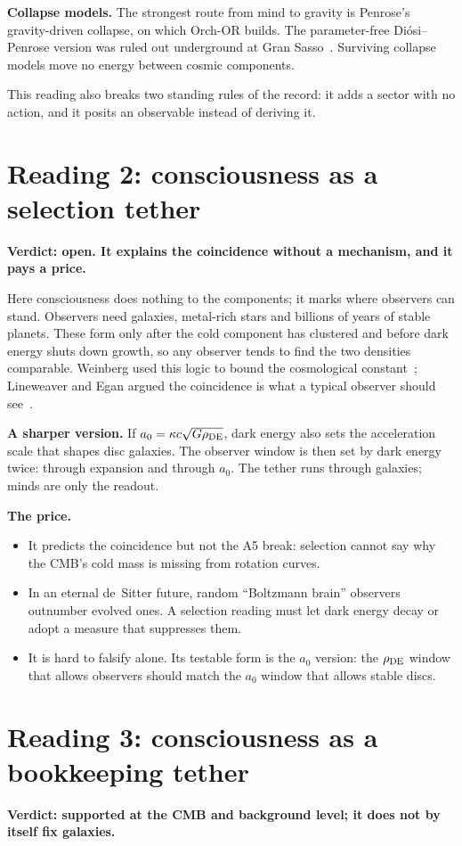 \documentclass[10pt]{article}
\begin{document}
\textbf{Collapse models.} The strongest route from mind to gravity is Penrose's gravity-driven collapse, on which Orch-OR builds. The parameter-free Di\'osi--Penrose version was ruled out underground at Gran Sasso~\cite{donadi}. Surviving collapse models move no energy between cosmic components.

This reading also breaks two standing rules of the record: it adds a sector with no action, and it posits an observable instead of deriving it.

\section{Reading 2: consciousness as a selection tether}\label{sec:selection}
\textbf{Verdict: open. It explains the coincidence without a mechanism, and it pays a price.}

Here consciousness does nothing to the components; it marks where observers can stand. Observers need galaxies, metal-rich stars and billions of years of stable planets. These form only after the cold component has clustered and before dark energy shuts down growth, so any observer tends to find the two densities comparable. Weinberg used this logic to bound the cosmological constant~\cite{weinberg}; Lineweaver and Egan argued the coincidence is what a typical observer should see~\cite{lineweaver}.

\textbf{A sharper version.} If $a_0=\kappa c\sqrt{G\rho_{\rm DE}}$, dark energy also sets the acceleration scale that shapes disc galaxies. The observer window is then set by dark energy twice: through expansion and through $a_0$. The tether runs through galaxies; minds are only the readout.

\textbf{The price.}
\begin{itemize}
\item It predicts the coincidence but not the A5 break: selection cannot say why the CMB's cold mass is missing from rotation curves.
\item In an eternal de~Sitter future, random ``Boltzmann brain'' observers outnumber evolved ones. A selection reading must let dark energy decay or adopt a measure that suppresses them.
\item It is hard to falsify alone. Its testable form is the $a_0$ version: the $\rho_{\rm DE}$ window that allows observers should match the $a_0$ window that allows stable discs.
\end{itemize}

\section{Reading 3: consciousness as a bookkeeping tether}\label{sec:book}
\textbf{Verdict: supported at the CMB and background level; it does not by itself fix galaxies.}
\end{document}
